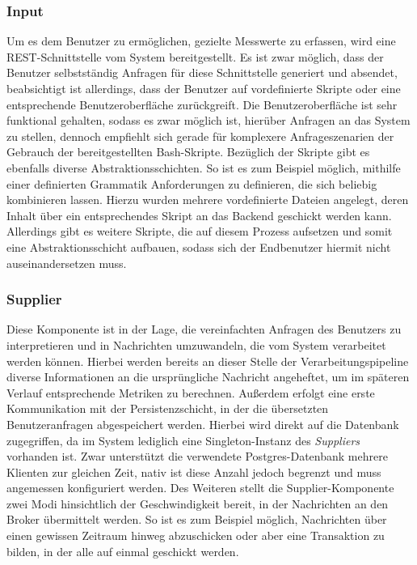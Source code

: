 \subsubsection{Input \checkmark}
Um es dem Benutzer zu ermöglichen, gezielte Messwerte zu erfassen, wird eine REST-Schnittstelle vom System bereitgestellt. Es ist zwar möglich, dass der Benutzer selbstständig Anfragen für diese Schnittstelle generiert und absendet, beabsichtigt ist allerdings, dass der Benutzer auf vordefinierte Skripte oder eine entsprechende Benutzeroberfläche zurückgreift. Die Benutzeroberfläche ist sehr funktional gehalten, sodass es zwar möglich ist, hierüber Anfragen an das System zu stellen, dennoch empfiehlt sich gerade für komplexere Anfrageszenarien der Gebrauch der bereitgestellten Bash-Skripte. Bezüglich der Skripte gibt es ebenfalls diverse Abstraktionsschichten. So ist es zum Beispiel möglich, mithilfe einer definierten Grammatik Anforderungen zu definieren, die sich beliebig kombinieren lassen. Hierzu wurden mehrere vordefinierte Dateien angelegt, deren Inhalt über ein entsprechendes Skript an das Backend geschickt werden kann. Allerdings gibt es weitere Skripte, die auf diesem Prozess aufsetzen und somit eine Abstraktionsschicht aufbauen, sodass sich der Endbenutzer hiermit nicht auseinandersetzen muss.

\subsubsection{Supplier \checkmark}
Diese Komponente ist in der Lage, die vereinfachten Anfragen des Benutzers zu interpretieren und in Nachrichten umzuwandeln, die vom System verarbeitet werden können. Hierbei werden bereits an dieser Stelle der Verarbeitungspipeline diverse Informationen an die ursprüngliche Nachricht angeheftet, um im späteren Verlauf entsprechende Metriken zu berechnen. Außerdem erfolgt eine erste Kommunikation mit der Persistenzschicht, in der die übersetzten Benutzeranfragen abgespeichert werden. Hierbei wird direkt auf die Datenbank zugegriffen, da im System lediglich eine Singleton-Instanz des \emph{Suppliers} vorhanden ist. Zwar unterstützt die verwendete Postgres-Datenbank mehrere Klienten zur gleichen Zeit, nativ ist diese Anzahl jedoch begrenzt und muss angemessen konfiguriert werden. Des Weiteren stellt die Supplier-Komponente zwei Modi hinsichtlich der Geschwindigkeit bereit, in der Nachrichten an den Broker übermittelt werden. So ist es zum Beispiel möglich, Nachrichten über einen gewissen Zeitraum hinweg abzuschicken oder aber eine Transaktion zu bilden, in der alle auf einmal geschickt werden.

